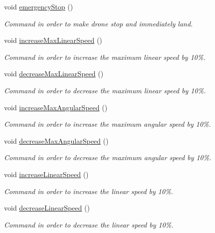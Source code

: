 \begin{DoxyCompactItemize}
void \hyperlink{class_nymeria_a871d92e2206ca9ceb768b1bc35b83e8d}{emergency\+Stop} ()
\begin{DoxyCompactList}\small\item\em Command in order to make drone stop and immediately land. \end{DoxyCompactList}\item 
void \hyperlink{class_nymeria_af0bf1c66411d398b7ffed2ce05b6d521}{increase\+Max\+Linear\+Speed} ()
\begin{DoxyCompactList}\small\item\em Command in order to increase the maximum linear speed by 10\%. \end{DoxyCompactList}\item 
void \hyperlink{class_nymeria_a3d7885e178ab495a79f4d7c6820b703a}{decrease\+Max\+Linear\+Speed} ()
\begin{DoxyCompactList}\small\item\em Command in order to decrease the maximum linear speed by 10\%. \end{DoxyCompactList}\item 
void \hyperlink{class_nymeria_abb97d909934b058ee3bf9d3e9090ad95}{increase\+Max\+Angular\+Speed} ()
\begin{DoxyCompactList}\small\item\em Command in order to increase the maximum angular speed by 10\%. \end{DoxyCompactList}\item 
void \hyperlink{class_nymeria_a32c636fb95fcf32793f7632c4675b57c}{decrease\+Max\+Angular\+Speed} ()
\begin{DoxyCompactList}\small\item\em Command in order to decrease the maximum angular speed by 10\%. \end{DoxyCompactList}\item 
void \hyperlink{class_nymeria_a9fdb89e4e84a7ad566b7d0e1e06c17a0}{increase\+Linear\+Speed} ()
\begin{DoxyCompactList}\small\item\em Command in order to increase the linear speed by 10\%. \end{DoxyCompactList}\item 
void \hyperlink{class_nymeria_a08983812723252986961fb810eb875f4}{decrease\+Linear\+Speed} ()
\begin{DoxyCompactList}\small\item\em Command in order to decrease the linear speed by 10\%. \end{DoxyCompactList}\item 

\end{DoxyCompactItemize}
